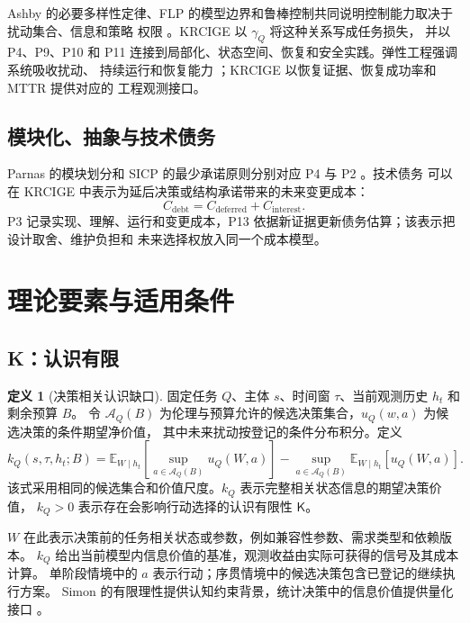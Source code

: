 \documentclass[11pt,a4paper]{ctexart}
\numberwithin{equation}{section}
\theoremstyle{definition}
\newtheorem{definition}{定义}[section]
\theoremstyle{plain}
\newcommand{\Know}{\mathsf{K}}
\begin{document}
Ashby 的必要多样性定律、FLP 的模型边界和鲁棒控制共同说明控制能力取决于扰动集合、信息和策略
权限 \cite{ashby1956,flp1985,skogestad2005}。KRCIGE 以 $\gamma_Q$ 将这种关系写成任务损失，
并以 P4、P9、P10 和 P11 连接到局部化、状态空间、恢复和安全实践。弹性工程强调系统吸收扰动、
持续运行和恢复能力 \cite{hollnagel2006}；KRCIGE 以恢复证据、恢复成功率和 MTTR 提供对应的
工程观测接口。

\subsection{模块化、抽象与技术债务}

Parnas 的模块划分和 SICP 的最少承诺原则分别对应 P4 与 P2 \cite{parnas1972,sicp1996}。技术债务
可以在 KRCIGE 中表示为延后决策或结构承诺带来的未来变更成本：
\[
C_{\mathrm{debt}}
=
C_{\mathrm{deferred}}
+
C_{\mathrm{interest}}.
\]
P3 记录实现、理解、运行和变更成本，P13 依据新证据更新债务估算；该表示把设计取舍、维护负担和
未来选择权放入同一个成本模型。

\section{理论要素与适用条件}

\subsection{K：认识有限}

\begin{definition}[决策相关认识缺口]
固定任务 $Q$、主体 $s$、时间窗 $\tau$、当前观测历史 $h_t$ 和剩余预算 $B$。
令 $\mathcal A_Q(B)$ 为伦理与预算允许的候选决策集合，$u_Q(w,a)$ 为候选决策的条件期望净价值，
其中未来扰动按登记的条件分布积分。定义
\begin{equation}
k_Q(s,\tau,h_t;B)=
\mathbb E_{W\mid h_t}\!\left[\sup_{a\in\mathcal A_Q(B)}u_Q(W,a)\right]
-\sup_{a\in\mathcal A_Q(B)}\mathbb E_{W\mid h_t}[u_Q(W,a)].
\label{eq:knowledge-gap}
\end{equation}
该式采用相同的候选集合和价值尺度。$k_Q$ 表示完整相关状态信息的期望决策价值，
$k_Q>0$ 表示存在会影响行动选择的认识有限性 $\Know$。
\end{definition}

$W$ 在此表示决策前的任务相关状态或参数，例如兼容性参数、需求类型和依赖版本。
$k_Q$ 给出当前模型内信息价值的基准，观测收益由实际可获得的信号及其成本计算。
单阶段情境中的 $a$ 表示行动；序贯情境中的候选决策包含已登记的继续执行方案。
Simon 的有限理性提供认知约束背景，统计决策中的信息价值提供量化接口
\cite{simon1978,howard1966}。
\end{document}
